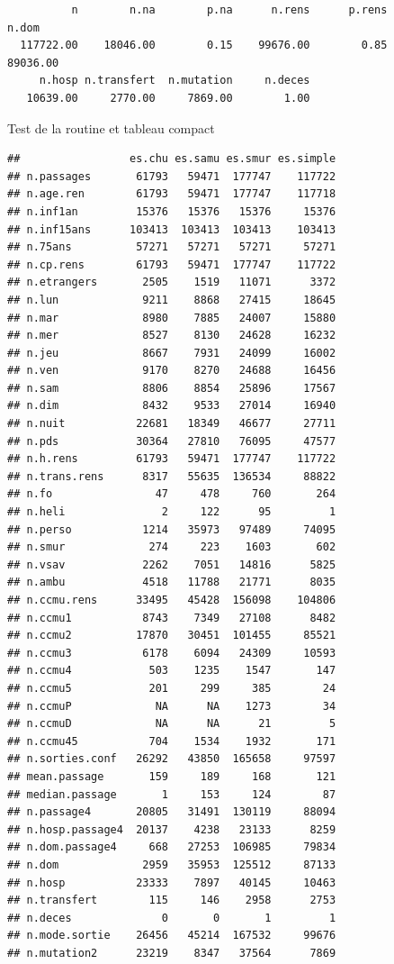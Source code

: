 \documentclass[]{article}
\begin{document}
\begin{verbatim}
          n        n.na        p.na      n.rens      p.rens       n.dom 
  117722.00    18046.00        0.15    99676.00        0.85    89036.00 
     n.hosp n.transfert  n.mutation     n.deces 
   10639.00     2770.00     7869.00        1.00 
\end{verbatim}

Test de la routine et tableau compact

\begin{verbatim}
##                 es.chu es.samu es.smur es.simple
## n.passages       61793   59471  177747    117722
## n.age.ren        61793   59471  177747    117718
## n.inf1an         15376   15376   15376     15376
## n.inf15ans      103413  103413  103413    103413
## n.75ans          57271   57271   57271     57271
## n.cp.rens        61793   59471  177747    117722
## n.etrangers       2505    1519   11071      3372
## n.lun             9211    8868   27415     18645
## n.mar             8980    7885   24007     15880
## n.mer             8527    8130   24628     16232
## n.jeu             8667    7931   24099     16002
## n.ven             9170    8270   24688     16456
## n.sam             8806    8854   25896     17567
## n.dim             8432    9533   27014     16940
## n.nuit           22681   18349   46677     27711
## n.pds            30364   27810   76095     47577
## n.h.rens         61793   59471  177747    117722
## n.trans.rens      8317   55635  136534     88822
## n.fo                47     478     760       264
## n.heli               2     122      95         1
## n.perso           1214   35973   97489     74095
## n.smur             274     223    1603       602
## n.vsav            2262    7051   14816      5825
## n.ambu            4518   11788   21771      8035
## n.ccmu.rens      33495   45428  156098    104806
## n.ccmu1           8743    7349   27108      8482
## n.ccmu2          17870   30451  101455     85521
## n.ccmu3           6178    6094   24309     10593
## n.ccmu4            503    1235    1547       147
## n.ccmu5            201     299     385        24
## n.ccmuP             NA      NA    1273        34
## n.ccmuD             NA      NA      21         5
## n.ccmu45           704    1534    1932       171
## n.sorties.conf   26292   43850  165658     97597
## mean.passage       159     189     168       121
## median.passage       1     153     124        87
## n.passage4       20805   31491  130119     88094
## n.hosp.passage4  20137    4238   23133      8259
## n.dom.passage4     668   27253  106985     79834
## n.dom             2959   35953  125512     87133
## n.hosp           23333    7897   40145     10463
## n.transfert        115     146    2958      2753
## n.deces              0       0       1         1
## n.mode.sortie    26456   45214  167532     99676
## n.mutation2      23219    8347   37564      7869
\end{verbatim}
\end{document}
